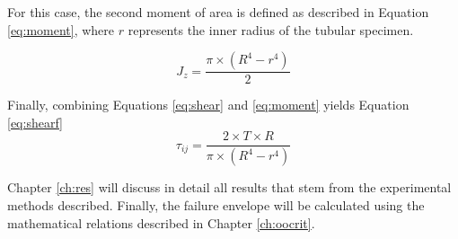 \documentclass[main.tex]{subfiles}
\begin{document}
For this case, the second moment of area is defined as described in Equation \ref{eq:moment}, where $r$ represents the inner radius of the tubular specimen.

\begin{equation}\label{eq:moment}
J_{z}=\frac{\pi\times (R^4-r^4)}{2}  
\end{equation}

Finally, combining Equations \ref{eq:shear} and \ref{eq:moment} yields Equation \ref{eq:shearf}
\begin{equation}\label{eq:shearf}
\tau_{ij}=\frac{2\times T \times R}{\pi\times(R^4-r^4)}  
\end{equation}


Chapter \ref{ch:res} will discuss in detail all results that stem from the experimental methods described. Finally, the failure envelope will be calculated using the mathematical relations described in Chapter \ref{ch:oocrit}.
% 
%

%
%
%
%
\end{document}
